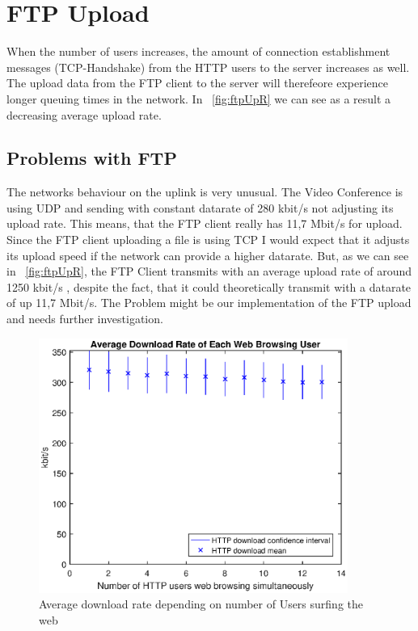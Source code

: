 \documentclass[a4paper,10pt]{book}\usepackage{graphicx}
\begin{document}
\section{FTP Upload}
When the number of users increases,  the amount of connection establishment messages (TCP-Handshake) from the HTTP 
users to the server increases as well. The upload data from the FTP client to the server will therefeore experience longer queuing times in the network.
In ~\ref{fig:ftpUpR} we can see as a result a decreasing average upload rate. 
\subsection{Problems with FTP}
\label{sec:ftp}
The networks behaviour on the uplink is very unusual. The Video Conference is using UDP and sending with constant datarate of 280 kbit/s not adjusting its upload rate. This means, that the FTP client really has 11,7 Mbit/s for upload.
Since the FTP client uploading a file is using TCP I would expect that it adjusts its upload speed if the network can provide a higher datarate.
But, as we can see in ~\ref{fig:ftpUpR}, the FTP Client transmits with an average upload rate of around 1250 kbit/s , despite the fact, that it could theoretically transmit with a datarate of up 11,7 Mbit/s.
The Problem might be our implementation of the FTP upload and needs further investigation.
\begin{figure}[!ht]
  \begin{center}
    \includegraphics[width=0.9\textwidth]{off_http_download.eps}
    \caption{Average download rate depending on number of Users surfing the web}
    \label{fig:httpDR}
  \end{center}
\end{figure}
\end{document}
